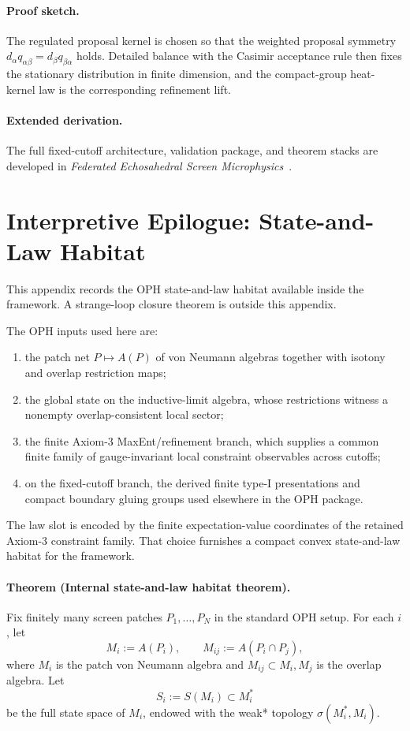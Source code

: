 \paragraph{Proof sketch.}
The regulated proposal kernel is chosen so that the weighted proposal symmetry
\(d_\alpha q_{\alpha\beta}=d_\beta q_{\beta\alpha}\) holds. Detailed balance with the Casimir
acceptance rule then fixes the stationary distribution in finite dimension, and the compact-group
heat-kernel law is the corresponding refinement lift.

\paragraph{Extended derivation.}
The full fixed-cutoff architecture, validation package, and theorem stacks are developed in
\emph{Federated Echosahedral Screen Microphysics}~\cite{ophmicrophysics}.

\section{Interpretive Epilogue: State-and-Law Habitat}

This appendix records the OPH state-and-law habitat available inside the
framework. A strange-loop closure theorem is outside this appendix.

The OPH inputs used here are:
\begin{enumerate}
\item the patch net \(P\mapsto A(P)\) of von Neumann algebras together with isotony and overlap
restriction maps;
\item the global state on the inductive-limit algebra, whose restrictions witness a nonempty
overlap-consistent local sector;
\item the finite Axiom-3 MaxEnt/refinement branch, which supplies a common finite family of
gauge-invariant local constraint observables across cutoffs;
\item on the fixed-cutoff branch, the derived finite type-I presentations and compact boundary
gluing groups used elsewhere in the OPH package.
\end{enumerate}

The law slot is encoded by the finite expectation-value coordinates of the retained Axiom-3
constraint family. That choice furnishes a compact convex state-and-law habitat for the framework.

\paragraph{Theorem (Internal state-and-law habitat theorem).}
Fix finitely many screen patches \(P_1,\dots,P_N\) in the standard OPH setup. For each \(i\), let
\[
M_i:=A(P_i),
\qquad
M_{ij}:=A(P_i\cap P_j),
\]
where \(M_i\) is the patch von Neumann algebra and \(M_{ij}\subset M_i,M_j\) is the overlap
algebra. Let
\[
S_i:=S(M_i)\subset M_i^*
\]
be the full state space of \(M_i\), endowed with the weak* topology \(\sigma(M_i^*,M_i)\).

